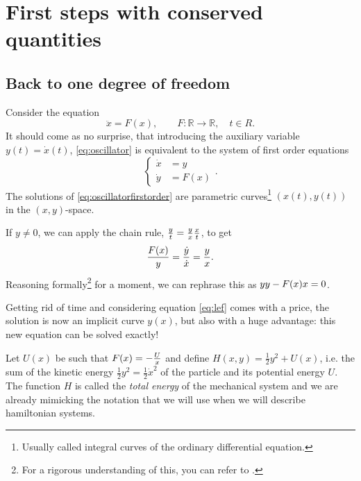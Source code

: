 \documentclass[english,fontsize=11pt,paper=a5,oneside]{scrbook}
\newcommand{\R}{\mathbb{R}}
\let\d\relax
\DeclareMathOperator{\d}{d}
\theoremstyle{definition}
\begin{document}
\section{First steps with conserved quantities}
\subsection{Back to one degree of freedom}\label{sec:bdf}

Consider the equation
\begin{equation}\label{eq:oscillator}
    \ddot x = F(x), \qquad F:\R\to\R, \quad t\in R.
\end{equation}
It should come as no surprise, that introducing the auxiliary variable $y(t) = \dot x(t)$, \eqref{eq:oscillator} is equivalent to the system of first order equations
\begin{equation}\label{eq:oscillatorfirstorder}
    \left\lbrace
    \begin{aligned}
        \dot x &= y \\
        \dot y &= F(x)
    \end{aligned}
    \right..
\end{equation}
The solutions of \eqref{eq:oscillatorfirstorder} are parametric curves\footnote{Usually called integral curves of the ordinary differential equation.} $(x(t),y(t))$ in the $(x,y)$-space.

If $y\neq0$, we can apply the chain rule, $\frac{\d y}{\d t} = \frac{\d y}{\d x} \frac{\d x}{\d t}$, to get
\begin{equation}\label{eq:lef}
    \frac{F(x)}y = \frac{\dot y}{\dot x} = \frac{\d y}{\d x}.
\end{equation}
Reasoning formally\footnote{For a rigorous understanding of this, you can refer to \cite[Equation (5.1) with $f=y$ and Remark 5.1.3]{lectures:aom:seri}.} for a moment, we can rephrase this as $y \d y - F(x) \d x = 0$.

Getting rid of time and considering equation \eqref{eq:lef} comes with a price, the solution is now an implicit curve $y(x)$, but also with a huge advantage: this new equation can be solved exactly!

Let $U(x)$ be such that $F(x) = -\frac{\d U}{\d x}$ and define $H(x, y) = \frac12 y^2 + U(x)$, i.e. the sum of the kinetic energy $\frac12 y^2 = \frac12 {\dot x}^2$ of the particle and its potential energy $U$.
The function $H$ is called the \emph{total energy} of the mechanical system and we are already mimicking the notation that we will use when we will describe hamiltonian systems.
\end{document}
